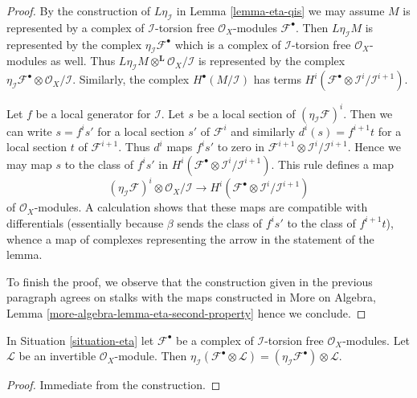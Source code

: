 \begin{proof}
By the construction of $L\eta_\mathcal{I}$ in Lemma \ref{lemma-eta-qis}
we may assume $M$ is represented by a complex of $\mathcal{I}$-torsion
free $\mathcal{O}_X$-modules $\mathcal{F}^\bullet$. Then
$L\eta_\mathcal{I}M$ is represented by the complex
$\eta_\mathcal{I}\mathcal{F}^\bullet$ which is a 
complex of $\mathcal{I}$-torsion free $\mathcal{O}_X$-modules as well.
Thus $L\eta_\mathcal{I}M \otimes^\mathbf{L} \mathcal{O}_X/\mathcal{I}$
is represented by the complex
$\eta_\mathcal{I}\mathcal{F}^\bullet \otimes \mathcal{O}_X/\mathcal{I}$.
Similarly, the complex $H^\bullet(M/\mathcal{I})$ has terms
$H^i(\mathcal{F}^\bullet \otimes \mathcal{I}^i/\mathcal{I}^{i + 1})$.

\medskip\noindent
Let $f$ be a local generator for $\mathcal{I}$.
Let $s$ be a local section of $(\eta_\mathcal{I}\mathcal{F})^i$.
Then we can write $s = f^is'$ for a local section $s'$ of
$\mathcal{F}^i$ and similarly $d^i(s) = f^{i + 1}t$ for a local
section $t$ of $\mathcal{F}^{i + 1}$. Thus $d^i$ maps $f^is'$
to zero in $\mathcal{F}^{i + 1} \otimes \mathcal{I}^i/\mathcal{I}^{i + 1}$.
Hence we may map $s$ to the class of $f^is'$ in
$H^i(\mathcal{F}^\bullet \otimes \mathcal{I}^i/\mathcal{I}^{i + 1})$.
This rule defines a map
$$
(\eta_\mathcal{I}\mathcal{F})^i \otimes \mathcal{O}_X/\mathcal{I}
\longrightarrow
H^i(\mathcal{F}^\bullet \otimes \mathcal{I}^i/\mathcal{I}^{i + 1})
$$
of $\mathcal{O}_X$-modules. A calculation shows that these maps
are compatible with differentials (essentially because $\beta$
sends the class of $f^is'$ to the class of $f^{i + 1}t$), whence
a map of complexes representing the arrow in the statement of the lemma.

\medskip\noindent
To finish the proof, we observe that the construction given
in the previous paragraph agrees on stalks with the maps
constructed in More on Algebra, Lemma
\ref{more-algebra-lemma-eta-second-property}
hence we conclude.
\end{proof}

\begin{lemma}
\label{lemma-eta-tensor-invertible}
In Situation \ref{situation-eta}
let $\mathcal{F}^\bullet$ be a complex of
$\mathcal{I}$-torsion free $\mathcal{O}_X$-modules.
Let $\mathcal{L}$ be an invertible $\mathcal{O}_X$-module.
Then $\eta_\mathcal{I}(\mathcal{F}^\bullet \otimes \mathcal{L}) =
(\eta_\mathcal{I}\mathcal{F}^\bullet) \otimes \mathcal{L}$.
\end{lemma}

\begin{proof}
Immediate from the construction.
\end{proof}

